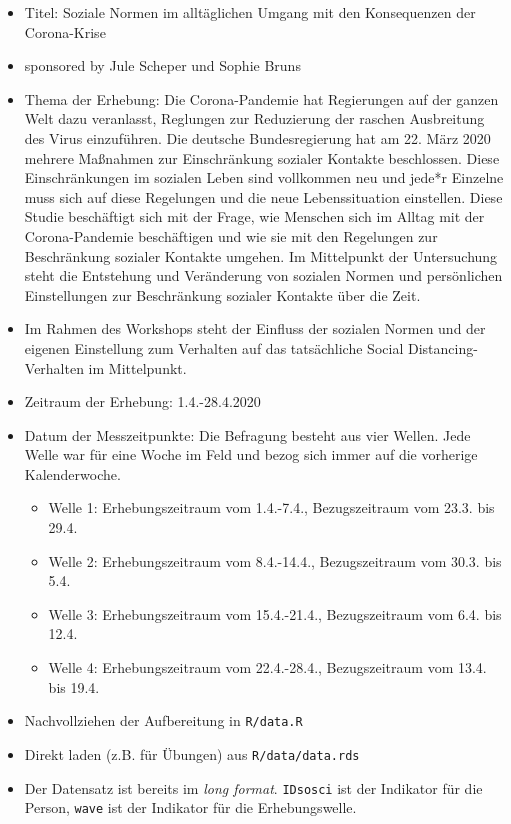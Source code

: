 \documentclass[
]{book}
\providecommand{\tightlist}{%
  \setlength{\itemsep}{0pt}\setlength{\parskip}{0pt}}
\begin{document}
\begin{itemize}
\item
  Titel: Soziale Normen im alltäglichen Umgang mit den Konsequenzen der Corona-Krise
\item
  sponsored by Jule Scheper und Sophie Bruns
\item
  Thema der Erhebung: Die Corona-Pandemie hat Regierungen auf der ganzen Welt dazu veranlasst, Reglungen zur Reduzierung der raschen Ausbreitung des Virus einzuführen. Die deutsche Bundesregierung hat am 22. März 2020 mehrere Maßnahmen zur Einschränkung sozialer Kontakte beschlossen. Diese Einschränkungen im sozialen Leben sind vollkommen neu und jede*r Einzelne muss sich auf diese Regelungen und die neue Lebenssituation einstellen. Diese Studie beschäftigt sich mit der Frage, wie Menschen sich im Alltag mit der Corona-Pandemie beschäftigen und wie sie mit den Regelungen zur Beschränkung sozialer Kontakte umgehen. Im Mittelpunkt der Untersuchung steht die Entstehung und Veränderung von sozialen Normen und persönlichen Einstellungen zur Beschränkung sozialer Kontakte über die Zeit.
\item
  Im Rahmen des Workshops steht der Einfluss der sozialen Normen und der eigenen Einstellung zum Verhalten auf das tatsächliche Social Distancing-Verhalten im Mittelpunkt.
\item
  Zeitraum der Erhebung: 1.4.-28.4.2020
\item
  Datum der Messzeitpunkte: Die Befragung besteht aus vier Wellen. Jede Welle war für eine Woche im Feld und bezog sich immer auf die vorherige Kalenderwoche.

  \begin{itemize}
  \tightlist
  \item
    Welle 1: Erhebungszeitraum vom 1.4.-7.4., Bezugszeitraum vom 23.3. bis 29.4.
  \item
    Welle 2: Erhebungszeitraum vom 8.4.-14.4., Bezugszeitraum vom 30.3. bis 5.4.
  \item
    Welle 3: Erhebungszeitraum vom 15.4.-21.4., Bezugszeitraum vom 6.4. bis 12.4.
  \item
    Welle 4: Erhebungszeitraum vom 22.4.-28.4., Bezugszeitraum vom 13.4. bis 19.4.
  \end{itemize}
\item
  Nachvollziehen der Aufbereitung in \texttt{R/data.R}
\item
  Direkt laden (z.B. für Übungen) aus \texttt{R/data/data.rds}
\item
  Der Datensatz ist bereits im \emph{long format}. \texttt{IDsosci} ist der Indikator für die Person, \texttt{wave} ist der Indikator für die Erhebungswelle.
\end{itemize}
\end{document}
